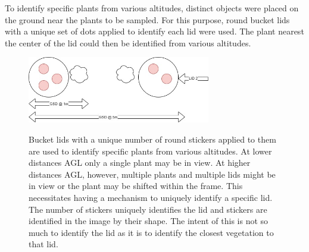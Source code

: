 \documentclass[letterpaper]{article}
\begin{document}
{To identify specific plants from various altitudes, distinct objects were placed on the ground near the plants to be sampled. For this purpose, round bucket lids with a unique set of dots applied to identify each lid were used. The plant nearest the center of the lid could then be identified from various altitudes.
\begin{figure}[h!]
	\centering
	\includegraphics[width=8cm]{./figures/lids.jpg}
	\label{fig:bucket-lids}
	\caption[Identification of specific plants using bucket lids]{Bucket lids with a unique number of round stickers applied to them are used to identify specific plants from various altitudes. At lower distances AGL only a single plant may be in view. At higher distances AGL, however, multiple plants and multiple lids might be in view or the plant may be shifted within the frame. This necessitates having a mechanism to uniquely identify a specific lid. The number of stickers uniquely identifies the lid and stickers are identified in the image by their shape. The intent of this is not so much to identify the lid as it is to identify the closest vegetation to that lid.}
\end{figure}	

}
\end{document}
